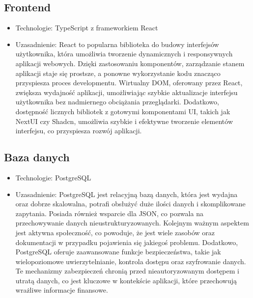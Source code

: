 \documentclass[12pt,titlepage]{article}
\begin{document}
\subsection{Frontend}
\begin{itemize}
    \item Technologie: TypeScript z frameworkiem React
    \item Uzasadnienie: React to popularna biblioteka do budowy interfejsów użytkownika, która umożliwia tworzenie dynamicznych i responsywnych aplikacji webowych. Dzięki zastosowaniu komponentów, zarządzanie stanem aplikacji staje się prostsze, a ponowne wykorzystanie kodu znacząco przyspiesza proces developmentu. Wirtualny DOM, oferowany przez React, zwiększa wydajność aplikacji, umożliwiając szybkie aktualizacje interfejsu użytkownika bez nadmiernego obciążania przeglądarki. Dodatkowo, dostępność licznych bibliotek z gotowymi komponentami UI, takich jak NextUI czy Shadcn, umożliwia szybkie i efektywne tworzenie elementów interfejsu, co przyspiesza rozwój aplikacji.
\end{itemize}

\subsection{Baza danych}
\begin{itemize}
    \item Technologie: PostgreSQL
    \item Uzasadnienie: PostgreSQL jest relacyjną bazą danych, która jest wydajna oraz dobrze skalowalna, potrafi obsłużyć duże ilości danych i skomplikowane zapytania. Posiada również wsparcie dla JSON, co pozwala na przechowywanie danych nieustrukturyzowanych. Kolejnym ważnym aspektem jest aktywna społeczność, co powoduje, że jest wiele zasobów oraz dokumentacji w przypadku pojawienia się jakiegoś problemu. Dodatkowo, PostgreSQL oferuje zaawansowane funkcje bezpieczeństwa, takie jak wielopoziomowe uwierzytelnianie, kontrola dostępu oraz szyfrowanie danych. Te mechanizmy zabezpieczeń chronią przed nieautoryzowanym dostępem i utratą danych, co jest kluczowe w kontekście aplikacji, które przechowują wrażliwe informacje finansowe.
\end{itemize}
\end{document}
